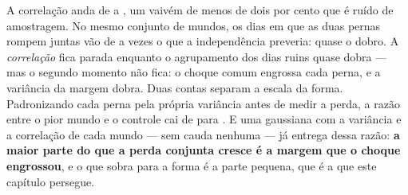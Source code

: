 \begin{table}[htbp]
  \centering
  \small
  \caption{A correlação declarada é respeitada em todos os mundos --- a medida vai de
    \numMargemCorrelacaoMenor{} a \numMargemCorrelacaoMaior{} ---, e o que muda é a cauda e o
    agrupamento dos dias ruins. A última coluna é o instrumento do capítulo da dependência: quantas
    vezes os dois rompem juntos, contra o que a independência preveria.}
  \label{tab:margem}
\end{table}

A correlação anda de \numMargemCorrelacaoMenor{} a \numMargemCorrelacaoMaior{}, um vaivém de menos
de dois por cento que é ruído de amostragem. No mesmo conjunto de mundos, os dias em que as duas
pernas rompem juntas vão de \numMargemExcessoMenor{} a \numMargemExcessoMaior{} vezes o que a
independência preveria: quase o dobro. A \emph{correlação} fica parada enquanto o agrupamento dos dias
ruins quase dobra --- mas o segundo momento não fica: o choque comum engrossa cada perna, e a
variância da margem dobra. Duas contas separam a escala da forma. Padronizando cada perna pela própria
variância antes de medir a perda, a razão entre o pior mundo e o controle cai de \numMargemPerdaRazao{}
para \numMargemPerdaPadraoRazao. E uma gaussiana com a variância e a correlação de cada mundo --- sem
cauda nenhuma --- já entrega \numMargemPerdaGaussianaRazao{} dessa razão: \textbf{a maior parte do que
a perda conjunta cresce é a margem que o choque engrossou}, e o que sobra para a forma é a parte
pequena, que é a que este capítulo persegue.

